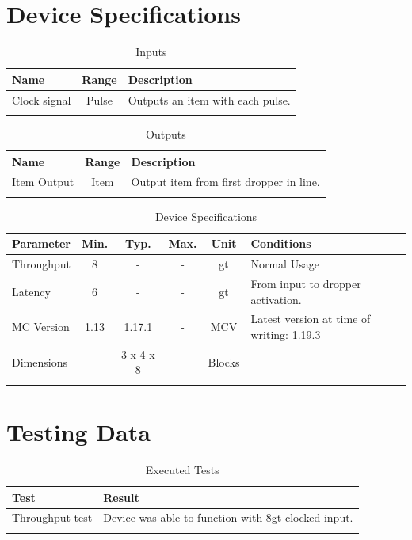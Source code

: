 \documentclass[10pt]{datasheet}
\begin{document}
\section{Device Specifications}

\begin{table}[h]
    \caption{Inputs}
    \begin{tabularx}{\textwidth}{l | c | X}
        \thickhline
        \textbf{Name} & \textbf{Range} & \textbf{Description} \\
        \hline
        Clock signal & Pulse & Outputs an item with each pulse. \\
        \thickhline
\end{tabularx}
\end{table}

\begin{table}[h]
    \caption{Outputs}
    \begin{tabularx}{\textwidth}{l | c | X}
        \thickhline
        \textbf{Name} & \textbf{Range} & \textbf{Description} \\
        \hline
        Item Output & Item & Output item from first dropper in line. \\
        \thickhline
\end{tabularx}
\end{table}

\begin{table}[h]
    \caption{Device Specifications}
    \begin{tabularx}{\textwidth}{l | c c c | c | X}
        \thickhline
        \textbf{Parameter} & \textbf{Min.} & \textbf{Typ.} & \textbf{Max.} &
        \textbf{Unit} & \textbf{Conditions} \\
        \hline
        Throughput  & 8 & - & - & gt & Normal Usage \\
        \hline
        Latency    & 6 & - & - & gt & From input to dropper activation. \\
        \hline
        MC Version & 1.13 & 1.17.1 & - & MCV & Latest version at time of writing: 1.19.3\\
        \hline
        Dimensions & & 3 x 4 x 8 & & Blocks & \\
        \thickhline
\end{tabularx}
\end{table}
\newpage
\section{Testing Data}
\begin{table}[h]
\caption{Executed Tests}
\begin{tabularx}{\textwidth}{l | X}
    \thickhline
    \textbf{Test} & \textbf{Result} \\
    \hline
    Throughput test & Device was able to function with 8gt clocked input. \\
    \thickhline
\end{tabularx}
\end{table}
\end{document}
